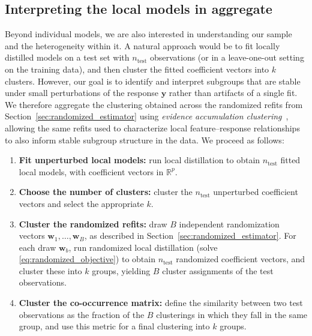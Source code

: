 \documentclass[12pt]{article}
\newcommand{\R}{\mathbb{R}}
\theoremstyle{definition}
\begin{document}
\subsection{Interpreting the local models in aggregate}
\label{sec:interpretation_aggregate}

Beyond individual models, we are also interested in understanding our sample and the heterogeneity within it. A natural approach would be to fit locally distilled models on a test set with $n_{\text{test}}$ observations (or in a leave-one-out setting on the training data), and then cluster the fitted coefficient vectors into $k$ clusters. 
However, our goal is to identify and interpret subgroups that are stable under small perturbations of the response $\bm{y}$ rather than artifacts of a single fit. 
We therefore aggregate the clustering obtained across the randomized refits from Section~\ref{sec:randomized_estimator} using \emph{evidence accumulation clustering}~\cite{fred2005combining}, allowing the same refits used to characterize local feature--response relationships to also inform stable subgroup structure in the data.
We proceed as follows:

\begin{enumerate}
  \item \textbf{Fit unperturbed local models:} run local distillation to obtain $n_{\text{test}}$ fitted local 
  models, with coefficient vectors in $\R^p$.
  \item \textbf{Choose the number of clusters:} cluster the $n_{\text{test}}$ unperturbed coefficient vectors and select the appropriate $k$.
  \item \textbf{Cluster the randomized refits:} draw $B$ independent  randomization vectors $\bm{w}_1, \ldots, \bm{w}_B$, as described in Section~\ref{sec:randomized_estimator}. For each draw  $\bm{w}_b$, run randomized local distillation (solve \eqref{eq:randomized_objective}) to obtain $n_{\text{test}}$ randomized coefficient vectors, and cluster these into $k$ groups, yielding $B$ cluster assignments of  the test observations.
  \item \textbf{Cluster the co-occurrence matrix:} define the similarity between two test observations as the fraction of the $B$ clusterings in which they fall in the same group, and use this metric for a final clustering into $k$ groups.
\end{enumerate}
\end{document}
